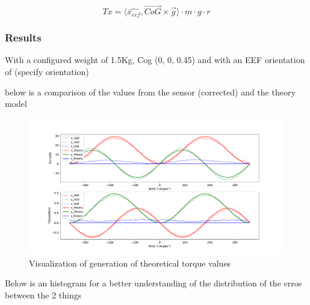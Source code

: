 \[ Tx = \langle\hat{x_{eef}} , \vec{CoG} \times \vec{g} \rangle \cdot m \cdot g\cdot r \]


\subsubsection{Results}

\par With a configured weight of 1.5Kg, Cog (0, 0, 0.45) and with an EEF orientation of (specify orientation)

\par below is a comparison of the values from the sensor (corrected) and the theory model

\begin{figure}[h]
    \centering
    \includegraphics[width=\linewidth]{figs/chp3/ft_sensor_theory.pdf}
    \caption{Visualization of generation of theoretical torque values}
    \label{fig:ft_sensor_theory}
\end{figure}


\par Below is an histogram for a better understanding of the distribution of the erros between the 2 things

